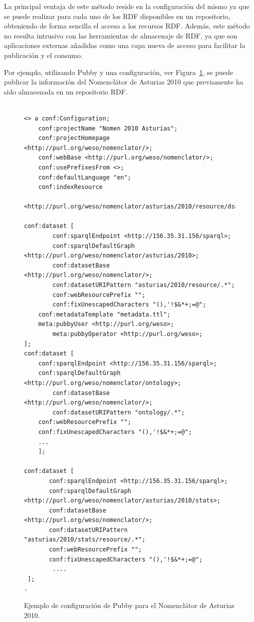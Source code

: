 La principal ventaja de este método reside en la configuración del mismo ya que se puede
realizar para cada uno de los \dataset RDF disponibles en un repositorio, obteniendo
de forma sencilla el acceso a los recursos RDF. Además, este método no resulta intrusivo
con las herramientas de almacenaje de RDF, ya que son aplicaciones externas añadidas como una capa nueva de acceso para facilitar 
la publicación y el consumo.

Por ejemplo, utilizando \gls{Pubby} y una configuración, ver Figura~\ref{fig:nomen-pubby}, se puede 
publicar la información del Nomenclátor de Asturias 2010 que previamente ha sido almacenada
en un repositorio RDF.

\begin{figure}[!htp]
\begin{lstlisting}

<> a conf:Configuration;
    conf:projectName "Nomen 2010 Asturias";
    conf:projectHomepage <http://purl.org/weso/nomenclator/>;
    conf:webBase <http://purl.org/weso/nomenclator/>;
    conf:usePrefixesFrom <>;
    conf:defaultLanguage "en";
    conf:indexResource 
      <http://purl.org/weso/nomenclator/asturias/2010/resource/ds>;

conf:dataset [
        conf:sparqlEndpoint <http://156.35.31.156/sparql>;
        conf:sparqlDefaultGraph <http://purl.org/weso/nomenclator/asturias/2010>;
        conf:datasetBase <http://purl.org/weso/nomenclator/>;
        conf:datasetURIPattern "asturias/2010/resource/.*";
        conf:webResourcePrefix "";
        conf:fixUnescapedCharacters "(),'!$&*+;=@";
	conf:metadataTemplate "metadata.ttl";
	meta:pubbyUser <http://purl.org/weso>;
        meta:pubbyOperator <http://purl.org/weso>;
];
conf:dataset [
	conf:sparqlEndpoint <http://156.35.31.156/sparql>;
	conf:sparqlDefaultGraph <http://purl.org/weso/nomenclator/ontology>;
        conf:datasetBase <http://purl.org/weso/nomenclator/>;
        conf:datasetURIPattern "ontology/.*";
	conf:webResourcePrefix "";
	conf:fixUnescapedCharacters "(),'!$&*+;=@";
	...
    ];

conf:dataset [
       conf:sparqlEndpoint <http://156.35.31.156/sparql>;
       conf:sparqlDefaultGraph <http://purl.org/weso/nomenclator/asturias/2010/stats>;
       conf:datasetBase <http://purl.org/weso/nomenclator/>;
       conf:datasetURIPattern "asturias/2010/stats/resource/.*";
       conf:webResourcePrefix "";
       conf:fixUnescapedCharacters "(),'!$&*+;=@";
        ....
 ];
.
\end{lstlisting}
	\caption{Ejemplo de configuración de Pubby para el Nomenclátor de Asturias 2010.}
	\label{fig:nomen-pubby}
\end{figure}

